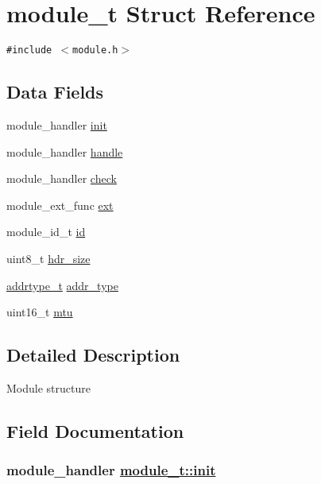 \hypertarget{structmodule__t}{
\section{module\_\-t Struct Reference}
\label{structmodule__t}
}
{\tt \#include $<$module.h$>$}

\subsection*{Data Fields}
\begin{CompactItemize}
\item 
module\_\-handler \hyperlink{structmodule__t_44cda748f1cc718519c176a1c93cf6e4}{init}
\item 
module\_\-handler \hyperlink{structmodule__t_2508e1e27ce2fbddbfb5aefcd5406bfb}{handle}
\item 
module\_\-handler \hyperlink{structmodule__t_ec8448cc809c87a4e86ed8534c3300af}{check}
\item 
module\_\-ext\_\-func \hyperlink{structmodule__t_04a569e519ee33f1391361047922fd2b}{ext}
\item 
module\_\-id\_\-t \hyperlink{structmodule__t_adfde6094c8c16eeeea923ddb5a958db}{id}
\item 
uint8\_\-t \hyperlink{structmodule__t_7641f6a11d4b3c82e2fc045b9c3cf0aa}{hdr\_\-size}
\item 
\hyperlink{address_8h_faf76b5591da0abd0584dec411d0551d}{addrtype\_\-t} \hyperlink{structmodule__t_887ec8c859dcc146253dcd16afffda53}{addr\_\-type}
\item 
uint16\_\-t \hyperlink{structmodule__t_f6fc529e7214ed8ba022da36b7e414a1}{mtu}
\end{CompactItemize}


\subsection{Detailed Description}
Module structure 



\subsection{Field Documentation}
\hypertarget{structmodule__t_44cda748f1cc718519c176a1c93cf6e4}{
\subsubsection[init]{\setlength{\rightskip}{0pt plus 5cm}module\_\-handler \hyperlink{structmodule__t_44cda748f1cc718519c176a1c93cf6e4}{module\_\-t::init}}}
\label{structmodule__t_44cda748f1cc718519c176a1c93cf6e4}


